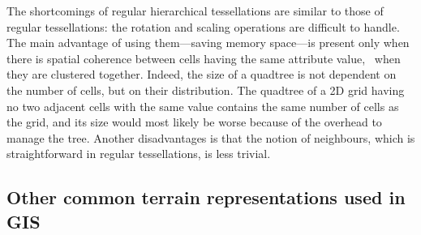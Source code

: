 %

The shortcomings of regular hierarchical tessellations are similar to those of regular tessellations: the rotation and scaling operations are difficult to handle.
The main advantage of using them---saving memory space---is present only when there is spatial coherence between cells having the same attribute value, \ie\ when they are clustered together.
Indeed, the size of a quadtree is not dependent on the number of cells, but on their distribution.
The quadtree of a 2D grid having no two adjacent cells with the same value contains the same number of cells as the grid, and its size would most likely be worse because of the overhead to manage the tree.
Another disadvantages is that the notion of neighbours, which is straightforward in regular tessellations, is less trivial.


\subsection{Other common terrain representations used in GIS}

